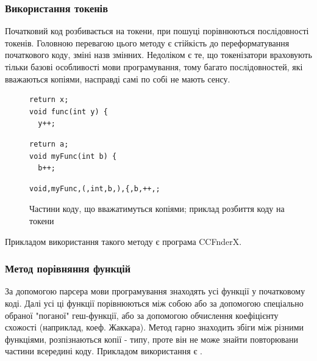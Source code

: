 \documentclass[a4paper, 14pt]{article}
\newcommand{\RNum}[1]{\uppercase\expandafter{\romannumeral #1\relax}}
\begin{document}
\subsubsection{Використання токенів}
Початковий код розбивається на токени, при пошуці порівнюються послідовності токенів.
Головною перевагою цього методу є стійкість до переформатування початкового коду, зміні назв змінних.
Недоліком є те, що токенізатори враховують тільки базові особливості мови програмування, тому багато послідовностей, які вважаються копіями, насправді самі по собі не мають сенсу. \cite{Koschke06}
\begin{figure}[h!]
\centering
\begin{minipage}[t]{.275\textwidth}
\begin{lstlisting}[frame=none]
return x;
void func(int y) {
  y++;
\end{lstlisting}
\end{minipage}
\begin{minipage}[t]{.275\textwidth}
\begin{lstlisting}[frame=none]
return a;
void myFunc(int b) {
  b++;
\end{lstlisting}
\end{minipage}
\begin{minipage}[t]{.35\textwidth}
\begin{lstlisting}[frame=none]
void,myFunc,(,int,b,),{,b,++,;
\end{lstlisting}
\end{minipage}
\caption*{Частини коду, що вважатимуться копіями; приклад розбиття коду на токени}
\end{figure}
Прикладом використання такого методу є програма CCFnderX. 
\subsubsection{Метод порівняння функцій}
За допомогою парсера мови програмування знаходять усі функції у початковому коді. Далі усі ці функції порівнюються між собою або за допомогою спеціально обраної "поганої" геш-функції, або за допомогою обчислення коефіцієнту схожості (наприклад, коеф. Жаккара).
Метод гарно знаходить збіги між різними функціями, розпізнаються копії \RNum{1}-\RNum{3} типу, проте він не може знайти повторювани частини всередині коду.
Прикладом використання є \cite{Yang18}.
\end{document}
